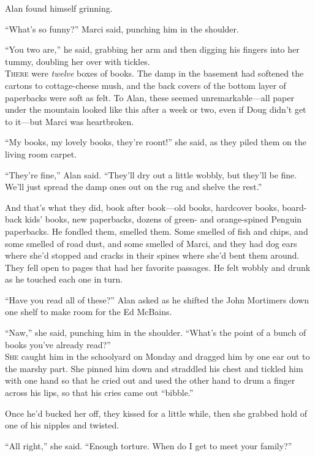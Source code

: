 Alan found himself grinning.

``What's so funny?'' Marci said, punching him in the shoulder.

``You two are,'' he said, grabbing her arm and then digging his
fingers into her tummy, doubling her over with tickles.
\\
\lettrine[lines=3, lhang=.5, nindent=0pt, findent=2pt]{T}{here} were \textit{twelve} boxes of books.  The damp in the basement
had softened the cartons to cottage-cheese mush, and the back covers
of the bottom layer of paperbacks were soft as felt.  To Alan, these
seemed unremarkable---all paper under the mountain looked like this
after a week or two, even if Doug didn't get to it---but Marci was
heartbroken.

``My books, my lovely books, they're roont!'' she said, as they piled
them on the living room carpet.

``They're fine,'' Alan said.  ``They'll dry out a little wobbly, but
they'll be fine.  We'll just spread the damp ones out on the rug and
shelve the rest.''

And that's what they did, book after book---old books, hardcover
books, board-back kids' books, new paperbacks, dozens of green- and
orange-spined Penguin paperbacks.  He fondled them, smelled them. 
Some smelled of fish and chips, and some smelled of road dust, and
some smelled of Marci, and they had dog ears where she'd stopped and
cracks in their spines where she'd bent them around.  They fell open
to pages that had her favorite passages.  He felt wobbly and drunk as
he touched each one in turn.

``Have you read all of these?'' Alan asked as he shifted the John
Mortimers down one shelf to make room for the Ed McBains.

``Naw,'' she said, punching him in the shoulder.  ``What's the point
of a bunch of books you've already read?''
\\
\lettrine[lines=3, lhang=.5, nindent=0pt, findent=2pt]{S}{he} caught him in the schoolyard on Monday and dragged him by one ear
out to the marshy part.  She pinned him down and straddled his chest
and tickled him with one hand so that he cried out and used the other
hand to drum a finger across his lips, so that his cries came out
``bibble.''

Once he'd bucked her off, they kissed for a little while, then she
grabbed hold of one of his nipples and twisted.

``All right,'' she said.  ``Enough torture.  When do I get to meet
your family?''

